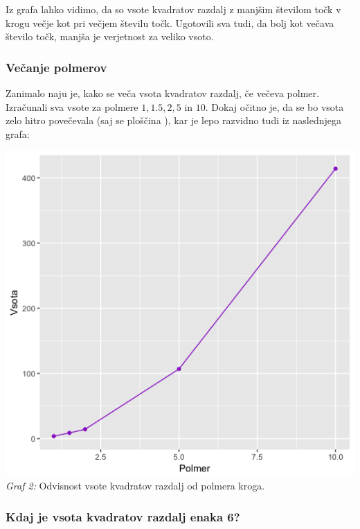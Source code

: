 \documentclass[a4paper]{article}
\begin{document}
Iz grafa lahko vidimo, da so vsote kvadratov razdalj z manjšim številom točk v krogu večje kot pri večjem številu točk. Ugotovili sva tudi, da bolj kot večava število točk, manjša je verjetnost za veliko vsoto. \\ 
\subsubsection{Večanje polmerov}

Zanimalo naju je, kako se veča vsota kvadratov razdalj, če večeva polmer. Izračunali sva vsote za polmere $1, 1.5, 2, 5$ in $10$. Dokaj očitno je, da se bo vsota zelo hitro povečevala (saj se ploščina ), kar je lepo razvidno tudi iz naslednjega grafa:
\begin{center}
\includegraphics[scale = 0.3]{krog_polmer}\\ 
\scriptsize{\textit{Graf 2: } Odvisnost vsote kvadratov razdalj od polmera kroga.}
\end{center}

\subsubsection{Kdaj je vsota kvadratov razdalj enaka 6?}
\end{document}
